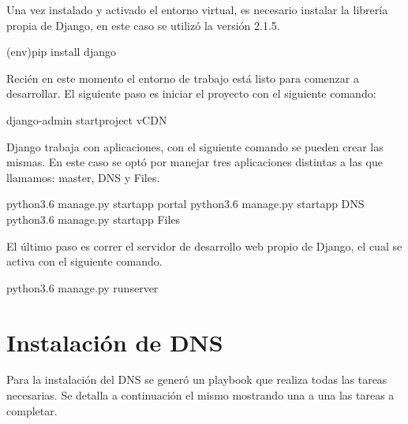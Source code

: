 \documentclass[12pt,a4paper,oneside]{book}
\begin{document}
Una vez instalado y activado el entorno virtual, es necesario instalar la librería propia de Django, en este caso se utilizó la versión 2.1.5.


\vspace{0.5cm}
\begin{frontend}
(env)pip install django
\end{frontend}
\vspace{0.5cm}

Recién en este momento el entorno de trabajo está listo para comenzar a desarrollar. 
El siguiente paso es iniciar el proyecto con el siguiente comando:


\vspace{0.5cm}
\begin{frontend}
django-admin startproject vCDN
\end{frontend}
\vspace{0.5cm}


Django trabaja con aplicaciones, con el siguiente comando se pueden crear las mismas. En este caso se optó por manejar tres aplicaciones distintas a las que llamamos: master, DNS y Files.

\vspace{0.5cm}
\begin{frontend}
python3.6 manage.py startapp portal
python3.6 manage.py startapp DNS
python3.6 manage.py startapp Files
\end{frontend}
\vspace{0.5cm}

El último paso es correr el servidor de desarrollo web propio de Django, el cual se activa con el siguiente comando.

\vspace{0.5cm}
\begin{frontend}
python3.6 manage.py runserver
\end{frontend}
\vspace{0.5cm}


\section{Instalación de DNS}
\label{seccA.4}
Para la instalación del DNS se generó un playbook que realiza todas las tareas necesarias. Se detalla a continuación el mismo mostrando una a una las tareas a completar.
\end{document}
